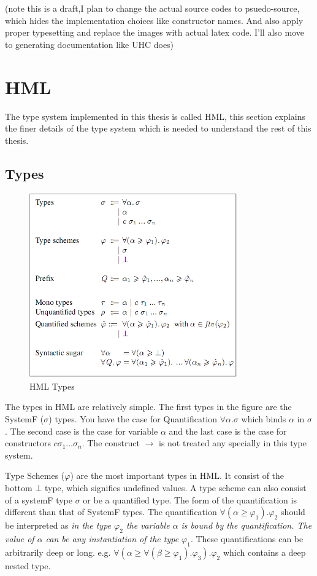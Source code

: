 \documentclass[12pt, a4paper, oneside]{article}
\begin{document}
(note this is a draft,I plan to change the actual source codes to psuedo-source, which hides the implementation choices like constructor names. And also apply proper typesetting and replace the images with actual latex code. I'll also move to generating documentation like UHC does)

\section{HML}
The type system implemented in this thesis is called HML, this section explains the finer details of the type system which is needed to understand the rest of this thesis.

\subsection{Types}

\begin{figure}[h!]
  \centering
    \includegraphics[width=0.8\textwidth]{types}
  \caption{HML Types}
\end{figure}

The types in HML are relatively simple. The first types in the figure are the SystemF ($\sigma$) types. You have the case for Quantification $\forall \alpha.\sigma$ which binds $\alpha$ in $\sigma$. The second case is the case for variable $\alpha$ and the last case is the case for constructors $c \sigma_1 \ldots \sigma_n$. The construct $\rightarrow$ is not treated any specially in this type system.

Type Schemes ($\varphi$) are the most important types in HML. It consist of the bottom $\bot$ type, which signifies undefined values. A type scheme can also consist of a systemF type $\sigma$ or be a quantified type. The form of the quantification is different than that of SystemF types. The quantification $\forall(\alpha \geq \varphi_1). \varphi_2$ should be interpreted as \emph{in the type $\varphi_2$ the variable $\alpha$ is bound by the quantification. The value of $\alpha$ can be any instantiation of the type $\varphi_1$}. These quantifications can be arbitrarily deep or long. e.g. $\forall(\alpha \geq \forall(\beta \geq \varphi_1). \varphi_3). \varphi_2$ which contains a deep nested type.
\end{document}
